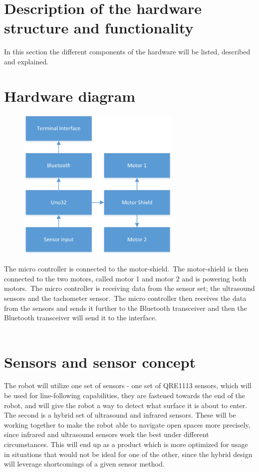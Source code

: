 \section{Description of the hardware structure and functionality}
 
In this section the different components of the hardware will be listed, described and explained.\


\section{Hardware diagram}
\begin{figure}[!ht]
	\centering
	\includegraphics[width=0.7\textwidth]{figures/UdklipDIA2.png}
	\caption{}
	\label{Hardware diagram}
\end{figure}

The micro controller is connected to the motor-shield.\ The motor-shield is then connected to the two motors, called motor 1 and motor 2 and is powering both motors.\ The micro controller is receiving data from the sensor set; the ultrasound sensors and the tachometer sensor.\ The micro controller then receives the data from the sensors and sends it further to the Bluetooth transceiver and then the Bluetooth transceiver will send it to the interface. \\ \\

\section{Sensors and sensor concept}
The robot will utilize one set of sensors - one set of QRE1113 sensors, which will be used for line-following capabilities, they are fastened towards the end of the robot, and will give the robot a way to detect what surface it is about to enter.\\
The second is a hybrid set of ultrasound and infrared sensors. These will be working together to make the robot able to navigate open spaces more precisely, since infrared and ultrasound sensors work the best under different circumstances. This will end up as a product which is more optimized for usage in situations that would not be ideal for one of the other, since the hybrid design will leverage shortcomings of a given sensor method.\\

